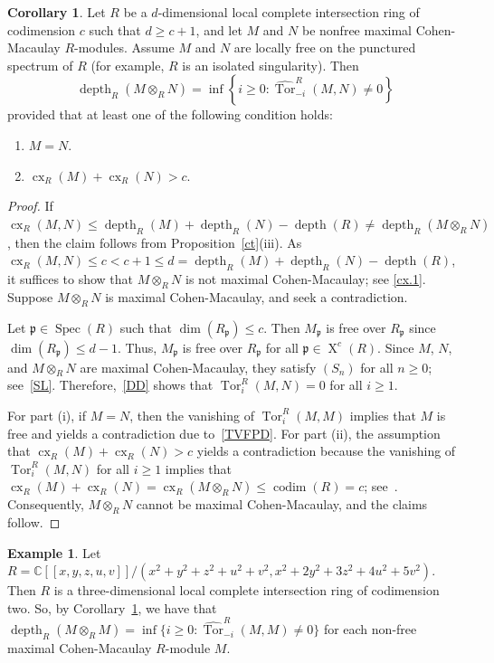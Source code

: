 \documentclass[11pt]{amsart}
\theoremstyle{definition}
\newtheorem{cor}[thm]{Corollary}
\theoremstyle{definition}
\newtheorem{eg}[thm]{Example}
\numberwithin{equation}{section}
\newcommand{\fp}{\mathfrak{p}}
\newcommand{\CC}{\mathbb{C}}
\DeclareMathOperator{\cx}{cx}
\DeclareMathOperator{\X}{X}
\DeclareMathOperator{\depth}{depth}
\DeclareMathOperator{\Spec}{Spec}
\DeclareMathOperator{\Tor}{Tor}
\DeclareMathOperator{\cod}{codim}
\begin{document}
\begin{cor} \label{ct-cor} Let $R$ be a $d$-dimensional local complete intersection ring of codimension $c$ such that $d\geq c+1$, and let $M$ and $N$ be nonfree maximal Cohen-Macaulay $R$-modules. Assume $M$ and $N$ are locally free on the punctured spectrum of $R$ (for example, $R$ is an isolated singularity). Then $$\depth_R(M\otimes_RN)=\inf\left\{i\geq 0: \widehat{\Tor}_{-i}^R(M,N)\neq 0 \right\}$$ provided that at least one of the following condition holds:
\begin{enumerate}[\rm(i)]
\item $M=N$.
\item $\cx_R(M)+\cx_R(N)>c$.
\end{enumerate}
\end{cor}

\begin{proof} If $\cx_R(M,N) \leq \depth_R(M)+\depth_R(N)-\depth(R) \neq \depth_R(M\otimes_RN)$, then the claim follows from Proposition~\ref{ct}(iii). As $\cx_R(M,N) \leq c<c+1\leq d=\depth_R(M)+\depth_R(N)-\depth(R)$, it suffices to show that $M\otimes_RN$ is not maximal Cohen-Macaulay; see \eqref{cx.1}. Suppose $M\otimes_RN$ is maximal Cohen-Macaulay, and seek a contradiction.

Let $\fp \in \Spec(R)$ such that $\dim(R_{\fp})\leq c$. Then $M_{\fp}$ is free over $R_{\fp}$ since $\dim(R_{\fp})\leq d-1$. Thus, $M_{\fp}$ is free over $R_{\fp}$ for all $\fp \in \X^{c}(R)$. Since $M$, $N$, and $M\otimes_RN$ are maximal Cohen-Macaulay, they satisfy $(S_n)$ for all $n\geq 0$; see~\ref{SL}. Therefore,~\ref{DD} shows that $\Tor_i^R(M,N)=0$ for all $i\geq 1$. 

For part (i), if $M=N$, then the vanishing of $\Tor_i^R(M,M)$ implies that $M$ is free and yields a contradiction due to~\ref{TVFPD}. For part (ii), the assumption that $\cx_R(M)+\cx_R(N)>c$ yields a contradiction because the vanishing of $\Tor_i^R(M,N)$ for all $i\geq 1$ implies that $\cx_R(M)+\cx_R(N)=\cx_R(M\otimes_RN)\leq \cod(R)=c$; see~\cite[2.1]{Mi}. Consequently, $M\otimes_RN$ cannot be maximal Cohen-Macaulay, and the claims follow.
\end{proof}

\begin{eg} Let $R=\CC[\![x,y,z,u,v]\!]/(x^2+y^2+z^2+u^2+v^2, x^2+2y^2+3z^2+4u^2+5v^2)$. Then $R$ is a three-dimensional local complete intersection ring of codimension two. So, by Corollary~\ref{ct-cor}, we have that $\depth_R(M\otimes_RM)=\inf\{i\geq 0: \widehat{\Tor}_{-i}^R(M,M)\neq0\}$ for each non-free maximal Cohen-Macaulay $R$-module $M$.
\end{eg}
\end{document}
